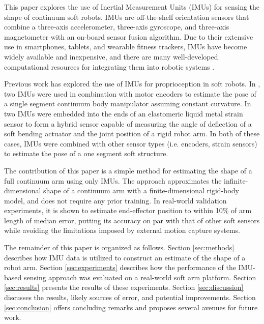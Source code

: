 This paper explores the use of Inertial Measurement Units (IMUs) for sensing the shape of continuum soft robots.
IMUs are off-the-shelf orientation sensors that combine a three-axis accelerometer, three-axis gyroscope, and three-axis magnetometer with an on-board sensor fusion algorithm.
Due to their extensive use in smartphones, tablets, and wearable fitness trackers, IMUs have become widely available and inexpensive, and there are many well-developed computational resources for integrating them into robotic systems \cite{ahmad2013reviews}.

Previous work has explored the use of IMUs for proprioception in soft robots.
In \cite{hughes2020sensing}, two IMUs were used in combination with motor encoders to estimate the pose of a single segment continuum body manipulator assuming constant curvature.
In \cite{yirmibesoglu2016hybrid} two IMUs were embedded into the ends of an elastomeric liquid metal strain sensor to form a hybrid sensor capable of measuring the angle of deflection of a soft bending actuator and the joint position of a rigid robot arm. 
In both of these cases, IMUs were combined with other sensor types (i.e. encoders, strain sensors) to estimate the pose of a one segment soft structure. 

The contribution of this paper is a simple method for estimating the shape of a full continuum arm using only IMUs.
The approach approximates the infinite-dimensional shape of a continuum arm with a finite-dimensional rigid-body model, and does not require any prior training.
In real-world validation experiments, it is shown to estimate end-effector position to within 10\% of arm length of median error, putting its accuracy on par with that of other soft sensors while avoiding the limitations imposed by external motion capture systems.

The remainder of this paper is organized as follows.
Section \ref{sec:methods} describes how IMU data is utilized to construct an estimate of the shape of a robot arm.
Section \ref{sec:experiments} describes how the performance of the IMU-based sensing approach was evaluated on a real-world soft arm platform.
Section \ref{sec:results} presents the results of these experiments.
Section \ref{sec:discussion} discusses the results, likely sources of error, and potential improvements.
Section \ref{sec:conclusion} offers concluding remarks and proposes several avenues for future work.
